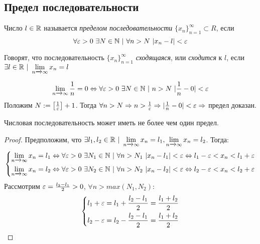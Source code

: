 \subsection{Предел последовательности}

\begin{definition}
    Число $l \in \mathbb{R}$ называется \textit{пределом последовательности} $\{x_n\}_{n = 1}^\infty \subset R$, если
    $$
        \forall \eps > 0\ \exists N \in \N\ |\ \forall n > N\ |x_n - l| < \eps
    $$
\end{definition}

\begin{definition}
    Говорят, что последовательность $\{x_n\}_{n = 1}^\infty$ \textit{сходящаяся}, или \textit{сходится} к $l$, если $\exists l \in \mathbb{R}\ |\ \lim\limits_{n \xrightarrow{} \infty} x_n = l$
\end{definition}

\begin{example}
    $$
        \liml_{n \xrightarrow{} \infty} \frac{1}{n} = 0 \lra \forall \eps > 0\ \exists N \in \N\ |\ n > N\ |\frac{1}{n} - 0| < \eps
    $$
    Положим $N := \left[\frac{1}{\varepsilon}\right] + 1$. Тогда $\forall n > N \Rightarrow n > \frac{1}{\varepsilon} \Rightarrow |\frac{1}{n} - 0| < \varepsilon \Rightarrow$ предел доказан.
\end{example}

\begin{theorem}
    Числовая последовательность может иметь не более чем один предел.
\end{theorem}

\begin{proof}
    Предположим, что $\exists l_1, l_2 \in \mathbb{R}\ |\ \lim\limits_{n \xrightarrow{} \infty} x_n = l_1, \lim\limits_{n \xrightarrow{} \infty} x_n = l_2$. Тогда:
    $$
        \left\{\begin{aligned}
        \lim\limits_{n \xrightarrow{} \infty} x_n = l_1 \Leftrightarrow \forall \varepsilon > 0\ \exists N_1 \in \mathbb{N}\ |\ \forall n > N_1\ |x_n - l_1| < \varepsilon \Leftrightarrow l_1 - \varepsilon < x_n < l_1 + \varepsilon
        \\
        \lim\limits_{n \xrightarrow{} \infty} x_n = l_2 \Leftrightarrow \forall \varepsilon > 0\ \exists N_2 \in \mathbb{N}\ |\ \forall n > N_2\ |x_n - l_2| < \varepsilon \Leftrightarrow l_2 - \varepsilon < x_n < l_2 + \varepsilon
        \end{aligned}\right.
    $$
    Рассмотрим $\varepsilon = \frac{l_2 - l_1}{2} > 0$, $\forall n > max(N_1, N_2)$:
    $$
        \left\{\begin{aligned}
        l_1 + \varepsilon = l_1 + \frac{l_2 - l_1}{2} = \frac{l_1 + l_2}{2}
        \\
        l_2 - \varepsilon = l_2 - \frac{l_2 - l_1}{2} = \frac{l_1 + l_2}{2}
        \end{aligned}\right.
    $$
\end{proof}

